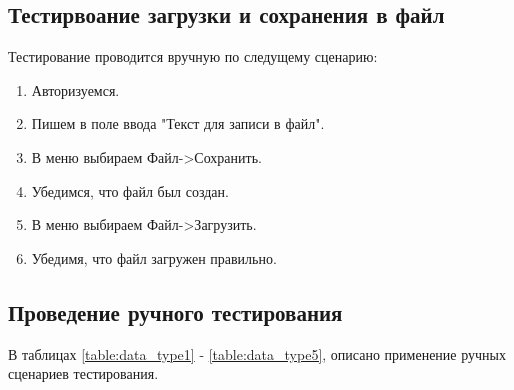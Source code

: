 \documentclass[a4paper,12pt]{article}
\begin{document}
\newpage \subsection{Тестирвоание загрузки и сохранения в файл}
Тестирование проводится вручную  по следущему сценарию:
\begin{enumerate}
\item Авторизуемся.
\item Пишем в поле ввода "Текст для записи в файл".
\item В меню выбираем Файл->Сохранить.
\item Убедимся, что файл был создан.
\item В меню выбираем Файл->Загрузить.
\item Убедимя, что файл загружен правильно.
\end{enumerate}

\newpage \subsection{Проведение ручного тестирования}

В таблицах \ref{table:data_type1} - \ref{table:data_type5}, описано применение ручных сценариев тестирования.
\end{document}

